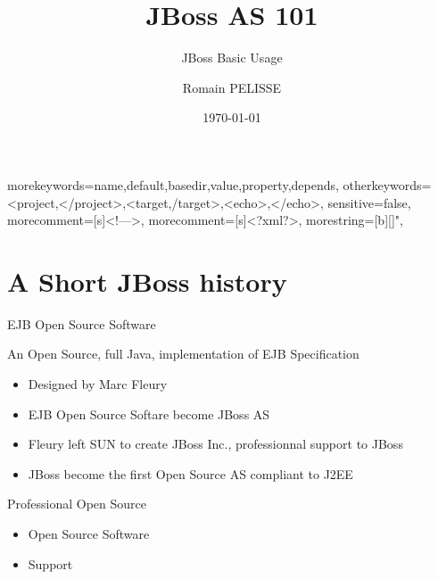 \documentclass[handout]{beamer}
\title{JBoss AS 101}
\subtitle{JBoss Basic Usage}
\author{Romain PELISSE}
\institute{ESME Sudria}
\date{\today}
\begin{document}
	{
		morekeywords={name,default,basedir,value,property,depends},
		otherkeywords={<project,</project>,<target,/target>,<echo>,</echo>},
		sensitive=false,
		morecomment=[s]{<!--}{-->},
		morecomment=[s]{<?xml}{?>},
		morestring=[b][\color{red}]",
	}


\frame{\titlepage}

\section[Outline]{}
\frame{\tableofcontents}

\section{A Short JBoss history}
	\begin{frame}{EJB Open Source Software}
		\begin{block}{An Open Source, full Java, implementation of EJB Specification}
			\begin{itemize}
				\item Designed by Marc Fleury
				\item EJB Open Source Softare become JBoss AS
				\item Fleury left SUN to create JBoss Inc., professionnal support to JBoss
				\item JBoss become the first Open Source AS compliant to J2EE 
			\end{itemize}
		\end{block}
		\begin{block}{Professional Open Source}
			\begin{itemize}
				\item Open Source Software 
				\item Support 
			\end{itemize}
		\end{block}	
	\end{frame}
\end{document}
